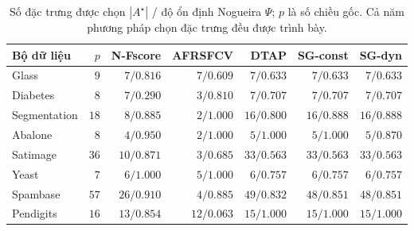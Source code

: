 \documentclass[]{interact}
\theoremstyle{plain}
\theoremstyle{definition}
\theoremstyle{remark}
\begin{document}
\begin{table}[htbp]
\centering\small\setlength{\tabcolsep}{4pt}
\caption{Số đặc trưng được chọn $|A^\star|$ / độ ổn định Nogueira $\Psi$; $p$ là số chiều gốc. Cả năm phương pháp chọn đặc trưng đều được trình bày.}\label{tab:nfeat}
\begin{tabular}{lrrrrrr}
\toprule
Bộ dữ liệu & $p$ & N-Fscore & AFRSFCV & DTAP & SG-const & SG-dyn \\
\midrule
Glass & $9$ & $7/0.816$ & $7/0.609$ & $7/0.633$ & $7/0.633$ & $7/0.633$ \\
Diabetes & $8$ & $7/0.290$ & $3/0.810$ & $7/0.707$ & $7/0.707$ & $7/0.707$ \\
Segmentation & $18$ & $8/0.885$ & $2/1.000$ & $16/0.800$ & $16/0.888$ & $16/0.888$ \\
Abalone & $8$ & $4/0.950$ & $2/1.000$ & $5/1.000$ & $5/1.000$ & $5/0.870$ \\
Satimage & $36$ & $10/0.871$ & $3/0.685$ & $33/0.563$ & $33/0.563$ & $33/0.563$ \\
Yeast & $7$ & $6/1.000$ & $5/1.000$ & $6/0.757$ & $6/0.757$ & $6/0.757$ \\
Spambase & $57$ & $26/0.910$ & $4/0.885$ & $49/0.832$ & $48/0.851$ & $48/0.851$ \\
Pendigits & $16$ & $13/0.854$ & $12/0.063$ & $15/1.000$ & $15/1.000$ & $15/1.000$ \\
\bottomrule
\end{tabular}

\end{table}
\end{document}
